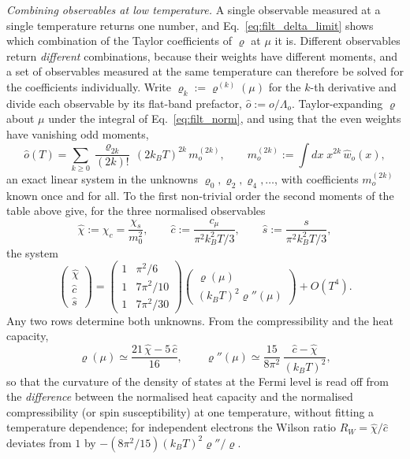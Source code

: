 \documentclass[10pt,a4paper]{article}
\theoremstyle{plain}
\theoremstyle{remark}
\begin{document}
\emph{Combining observables at low temperature.} A single observable measured at a
single temperature returns one number, and Eq.~\eqref{eq:filt_delta_limit} shows
which combination of the Taylor coefficients of $ \varrho $ at $ \mu $ it is. Different
observables return \emph{different} combinations, because their weights have
different moments, and a set of observables measured at the same temperature can
therefore be solved for the coefficients individually. Write
$ \varrho_k := \varrho^{(k)}(\mu) $ for the $ k $-th derivative and divide each observable
by its flat-band prefactor, $ \hat o := o/\Lambda_o $. Taylor-expanding $ \varrho $ about
$ \mu $ under the integral of Eq.~\eqref{eq:filt_norm}, and using that the even weights
have vanishing odd moments,
\[
  \hat o(T) = \sum_{k\geq0}\frac{\varrho_{2k}}{(2k)!}\,(2k_BT)^{2k}\,m^{(2k)}_o ,
  \qquad
  m^{(2k)}_o := \int dx\; x^{2k}\,\hat w_o(x) ,
\]
an exact linear system in the unknowns $ \varrho_0, \varrho_2, \varrho_4, \dots $, with
coefficients $ m^{(2k)}_o $ known once and for all. To the first non-trivial order the
second moments of the table above give, for the three normalised observables
\[
  \hat\chi := \chi_c = \frac{\chi_s}{m_0^{2}} , \qquad
  \hat c := \frac{c_\mu}{\pi^{2}k_B^{2}T/3} , \qquad
  \hat s := \frac{s}{\pi^{2}k_B^{2}T/3} ,
\]
the system
\[
  \begin{pmatrix} \hat\chi \\ \hat c \\ \hat s \end{pmatrix}
  = \begin{pmatrix} 1 & \pi^{2}/6 \\ 1 & 7\pi^{2}/10 \\ 1 & 7\pi^{2}/30 \end{pmatrix}
  \begin{pmatrix} \varrho(\mu) \\ (k_BT)^{2}\varrho''(\mu) \end{pmatrix}
  + O(T^{4}) .
\]
Any two rows determine both unknowns. From the compressibility and the heat
capacity,
\[
  \varrho(\mu) \simeq \frac{21\,\hat\chi - 5\,\hat c}{16} ,
  \qquad
  \varrho''(\mu) \simeq \frac{15}{8\pi^{2}}\,\frac{\hat c - \hat\chi}{(k_BT)^{2}} ,
\]
so that the curvature of the density of states at the Fermi level is read off from
the \emph{difference} between the normalised heat capacity and the normalised
compressibility (or spin susceptibility) at one temperature, without fitting a
temperature dependence; for independent electrons the Wilson ratio
$ R_W = \hat\chi/\hat c $ deviates from $ 1 $ by $ -(8\pi^{2}/15)(k_BT)^{2}\varrho''/\varrho $.
\end{document}
